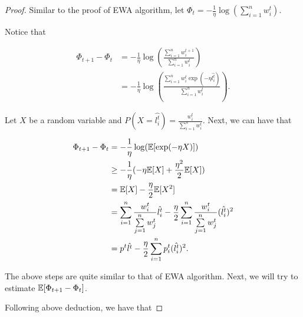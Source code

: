 \documentclass[../main.tex]{subfiles}
\begin{document}
\begin{proof}
	Similar to the proof of EWA algorithm, let $\Phi_t = - \frac{1}{\eta} \log (\sum\limits_{i=1}^n w_i^t)$.
	
	Notice that 
	
	\begin{equation*}
		\begin{aligned}
			\Phi_{t+1} - \Phi_t & = -\frac{1}{\eta} \log (\frac{\sum\limits_{i=1}^n w_i^{t+1}}{\sum\limits_{i=1}^n w_i^t}) \\
								& = -\frac{1}{\eta} \log (\frac{\sum\limits_{i=1}^n w_i^{t} \exp(-\eta \hat{l_i^t})}{\sum\limits_{i=1}^n w_i^t}).
		\end{aligned}
	\end{equation*}
	
	Let $X$ be a random variable and $P(X = \hat{l_i^t}) = \frac{w_i^t}{\sum\limits_{i=1}^n w_i^{t}}$. Next, we can have that
	
	\begin{equation*}
		\begin{aligned}
		\Phi_{t+1} - \Phi_t & = -\frac{1}{\eta} \log (\mathbb{E}[\exp(-\eta X)]) \\
							& \geq -\frac{1}{\eta} (-\eta \mathbb{E}[X] + \frac{\eta^2}{2} \mathbb{E}[X]) \\
							& = \mathbb{E}[X] - \frac{\eta}{2} \mathbb{E}[X^2] \\
							& = \sum\limits_{i=1}^n \frac{w_i^t}{\sum\limits_{j=1}^n w_j^{t}}  \hat{l_i^t} - \frac{\eta}{2} \sum\limits_{i=1}^n \frac{w_i^t}{\sum\limits_{j=1}^n w_j^{t}}  (\hat{l_i^t})^2 \\
							& = p^t \hat{l^t} - \frac{\eta}{2} \sum\limits_{i=1}^n p_i^t (\hat{l_i^t})^2.
		\end{aligned}
	\end{equation*}
	
	The above steps are quite similar to that of EWA algorithm. Next, we will try to estimate $\mathbb{E} [\Phi_{t+1} - \Phi_t]$.
	
	Following above deduction, we have that
	

\end{proof}
\end{document}
